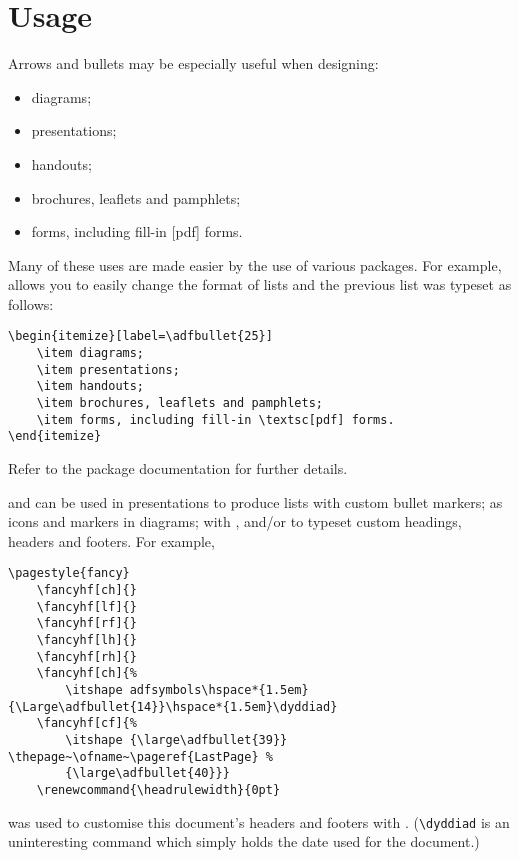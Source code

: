 \documentclass[10pt,british]{article}
\newcommand*{\dyddiad}{3\textsuperscript{rd} August, 2010}
\renewcommand{\headrulewidth}{0pt}
\begin{document}
\section{Usage}

Arrows and bullets may be especially useful when designing:
\begin{itemize}[label=]
	\item diagrams;
	\item presentations;
	\item handouts;
	\item brochures, leaflets and pamphlets;
	\item forms, including fill-in \textsc[pdf] forms.
\end{itemize}

Many of these uses are made easier by the use of various packages. For example,  allows you to easily change the format of lists and the previous list was typeset as follows:
\begin{verbatim}
\begin{itemize}[label=\adfbullet{25}]
	\item diagrams;
	\item presentations;
	\item handouts;
	\item brochures, leaflets and pamphlets;
	\item forms, including fill-in \textsc[pdf] forms.
\end{itemize}
\end{verbatim}
Refer to the package documentation for further details.

 and  can be used in  presentations to produce lists with custom bullet markers; as icons and markers in  diagrams; with ,  and/or  to typeset custom headings, headers and footers. For example,
\begin{verbatim}
\pagestyle{fancy}
	\fancyhf[ch]{}
	\fancyhf[lf]{}
	\fancyhf[rf]{}
	\fancyhf[lh]{}
	\fancyhf[rh]{}
	\fancyhf[ch]{%
		\itshape adfsymbols\hspace*{1.5em}{\Large\adfbullet{14}}\hspace*{1.5em}\dyddiad}
	\fancyhf[cf]{%
		\itshape {\large\adfbullet{39}} \thepage~\ofname~\pageref{LastPage} %
		{\large\adfbullet{40}}}
	\renewcommand{\headrulewidth}{0pt}
\end{verbatim}
was used to customise this document's headers and footers with . (\verb|\dyddiad| is an uninteresting command which simply holds the date used for the document.)
\end{document}
